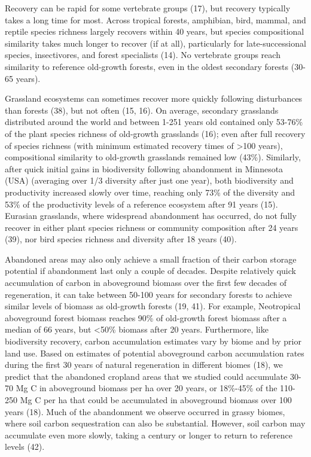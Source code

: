 \documentclass[9pt,twocolumn,twoside,]{pnas-new}
\begin{document}
Recovery can be rapid for some vertebrate groups (17), but recovery typically takes a long time for most.
Across tropical forests, amphibian, bird, mammal, and reptile species richness largely recovers within 40 years, but species compositional similarity takes much longer to recover (if at all), particularly for late-successional species, insectivores, and forest specialists (14).
No vertebrate groups reach similarity to reference old-growth forests, even in the oldest secondary forests (30-65 years).

Grassland ecosystems can sometimes recover more quickly following disturbances than forests (38), but not often (15, 16).
On average, secondary grasslands distributed around the world and between 1-251 years old contained only 53-76\% of the plant species richness of old-growth grasslands (16); even after full recovery of species richness (with minimum estimated recovery times of \textgreater100 years), compositional similarity to old-growth grasslands remained low (43\%).
Similarly, after quick initial gains in biodiversity following abandonment in Minnesota (USA) (averaging over 1/3 diversity after just one year), both biodiversity and productivity increased slowly over time, reaching only 73\% of the diversity and 53\% of the productivity levels of a reference ecosystem after 91 years (15).
Eurasian grasslands, where widespread abandonment has occurred, do not fully recover in either plant species richness or community composition after 24 years (39), nor bird species richness and diversity after 18 years (40).

Abandoned areas may also only achieve a small fraction of their carbon storage potential if abandonment last only a couple of decades.
Despite relatively quick accumulation of carbon in aboveground biomass over the first few decades of regeneration, it can take between 50-100 years for secondary forests to achieve similar levels of biomass as old-growth forests (19, 41).
For example, Neotropical aboveground forest biomass reaches 90\% of old-growth forest biomass after a median of 66 years, but \textless50\% biomass after 20 years.
Furthermore, like biodiversity recovery, carbon accumulation estimates vary by biome and by prior land use.
Based on estimates of potential aboveground carbon accumulation rates during the first 30 years of natural regeneration in different biomes (18), we predict that the abandoned cropland areas that we studied could accumulate 30-70 Mg C in aboveground biomass per ha over 20 years, or 18\%-45\% of the 110-250 Mg C per ha that could be accumulated in aboveground biomass over 100 years (18).
Much of the abandonment we observe occurred in grassy biomes, where soil carbon sequestration can also be substantial.
However, soil carbon may accumulate even more slowly, taking a century or longer to return to reference levels (42).
\end{document}
